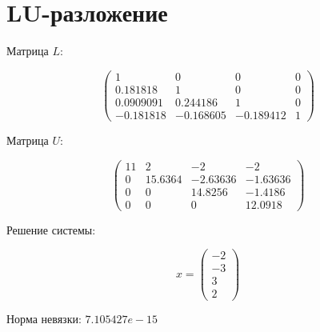 \section*{LU-разложение}

Матрица $L$:

\[
\begin{pmatrix}
1 & 0 & 0 & 0 \\
0.181818 & 1 & 0 & 0 \\
0.0909091 & 0.244186 & 1 & 0 \\
-0.181818 & -0.168605 & -0.189412 & 1
\end{pmatrix}
\]

Матрица $U$:

\[
\begin{pmatrix}
11 & 2 & -2 & -2 \\
0 & 15.6364 & -2.63636 & -1.63636 \\
0 & 0 & 14.8256 & -1.4186 \\
0 & 0 & 0 & 12.0918
\end{pmatrix}
\]

Решение системы:

\[
x = \begin{pmatrix}
-2 \\
-3 \\
3 \\
2
\end{pmatrix}
\]

Норма невязки: $7.105427e-15$
